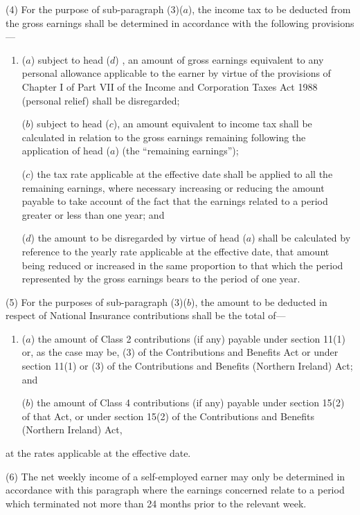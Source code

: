 \documentclass[12pt,a4paper]{article}
\begin{document}
(4) For the purpose of sub-paragraph (3)($a$), the income tax to be deducted from the gross earnings shall be determined in accordance with the following provisions—
\begin{enumerate}\item[]
($a$) subject to head ($d$) , an amount of gross earnings equivalent to any personal allowance applicable to the earner by virtue of the provisions of Chapter I of Part VII of the Income and Corporation Taxes Act 1988 (personal relief) shall be disregarded;

($b$) subject to head ($c$), an amount equivalent to income tax shall be calculated in relation to the gross earnings remaining following the application of head ($a$)  (the “remaining earnings”);

($c$) the tax rate applicable at the effective date shall be applied to all the remaining earnings, where necessary increasing or reducing the amount payable to take account of the fact that the earnings related to a period greater or less than one year; and

($d$) the amount to be disregarded by virtue of head ($a$)  shall be calculated by reference to the yearly rate applicable at the effective date, that amount being reduced or increased in the same proportion to that which the period represented by the gross earnings bears to the period of one year.
\end{enumerate}

(5) For the purposes of sub-paragraph (3)($b$), the amount to be deducted in respect of National Insurance contributions shall be the total of—
\begin{enumerate}\item[]
($a$) the amount of Class 2 contributions (if any) payable under section 11(1) or, as the case may be, (3) of the Contributions and Benefits Act or under section 11(1) or (3) of the Contributions and Benefits (Northern Ireland) Act; and

($b$) the amount of Class 4 contributions (if any) payable under section 15(2) of that Act, or under section 15(2) of the Contributions and Benefits (Northern Ireland) Act,
\end{enumerate}
at the rates applicable at the effective date.

(6) The net weekly income of a self-employed earner may only be determined in accordance with this paragraph where the earnings concerned relate to a period which terminated not more than 24 months prior to the relevant week.
\end{document}

